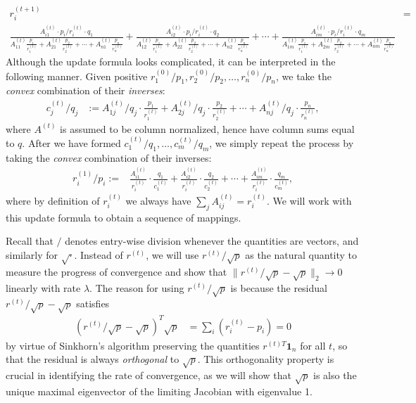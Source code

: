 \begin{align*}
r_{i}^{(t+1)} & =\\
\frac{A_{i1}^{(t)}\cdot p_{i}/r_{i}^{(t)}\cdot q_{1}}{A_{11}^{(t)}\frac{p_{1}}{r_{1}^{(t)}}+A_{21}^{(t)}\frac{p_{2}}{r_{2}^{(t)}}+\cdots+A_{n1}^{(t)}\frac{p_{n}}{r_{n}^{(t)}}}+\frac{A_{i2}^{(t)}\cdot p_{i}/r_{i}^{(t)}\cdot q_{2}}{A_{12}^{(t)}\frac{p_{1}}{r_{1}^{(t)}}+A_{22}^{(t)}\frac{p_{2}}{r_{2}^{(t)}}+\cdots+A_{n2}^{(t)}\frac{p_{n}}{r_{n}^{(t)}}}+\cdots+\frac{A_{im}^{(t)}\cdot p_{i}/r_{i}^{(t)}\cdot q_{m}}{A_{1m}^{(t)}\frac{p_{1}}{r_{1}^{(t)}}+A_{2m}^{(t)}\frac{p_{2}}{r_{2}^{(t)}}+\cdots+A_{nm}^{(t)}\frac{p_{n}}{r_{n}^{(t)}}}
\end{align*}
Although the update formula looks complicated, it can be interpreted
in the following manner. Given positive $r_{1}^{(0)}/p_{1},r_{2}^{(0)}/p_{2},\dots,r_{n}^{(0)}/p_{n}$,
we take the\emph{ convex} combination of their \emph{inverses}:
\begin{align*}
c_{j}^{(t)}/q_{j} & :=A_{1j}^{(t)}/q_{j}\cdot\frac{p_{1}}{r_{1}^{(t)}}+A_{2j}^{(t)}/q_{j}\cdot\frac{p_{2}}{r_{2}^{(t)}}+\cdots+A_{nj}^{(t)}/q_{j}\cdot\frac{p_{n}}{r_{n}^{(t)}},
\end{align*}
 where $A^{(t)}$ is assumed to be column normalized, hence have column
sums equal to $q$. After we have formed $c_{1}^{(t)}/q_{1},\dots,c_{m}^{(t)}/q_{m}$,
we simply repeat the process by taking the \emph{convex} combination
of their inverses: 
\begin{align*}
r_{i}^{(1)}/p_{i}:= & \frac{A_{i1}^{(t)}}{r_{i}^{(t)}}\cdot\frac{q_{1}}{c_{1}^{(t)}}+\frac{A_{i2}^{(t)}}{r_{i}^{(t)}}\cdot\frac{q_{2}}{c_{2}^{(t)}}+\cdots+\frac{A_{im}^{(t)}}{r_{i}^{(t)}}\cdot\frac{q_{m}}{c_{m}^{(t)}},
\end{align*}
 where by definition of $r_{i}^{(t)}$ we always have $\sum_{j}A_{ij}^{(t)}=r_{i}^{(t)}$.
We will work with this update formula to obtain a sequence of mappings. 

Recall that $/$ denotes entry-wise division whenever the quantities
are vectors, and similarly for $\sqrt{\cdot}$. Instead of $r^{(t)}$,
we will use $r^{(t)}/\sqrt{p}$ as the natural quantity to measure
the progress of convergence and show that $\|r^{(t)}/\sqrt{p}-\sqrt{p}\|_{2}\rightarrow0$
linearly with rate $\lambda$. The reason for using $r^{(t)}/\sqrt{p}$
is because the residual $r^{(t)}/\sqrt{p}-\sqrt{p}$ satisfies 
\begin{align*}
(r^{(t)}/\sqrt{p}-\sqrt{p})^{T}\sqrt{p} & =\sum_{i}(r_{i}^{(t)}-p_{i})=0
\end{align*}
by virtue of Sinkhorn's algorithm preserving the quantities $r^{(t)T}\mathbf{1}_{n}$
for all $t$, so that the residual is always \emph{orthogonal} to
$\sqrt{p}$. This orthogonality property is crucial in identifying the rate of convergence,
as we will show that $\sqrt{p}$ is also the unique maximal eigenvector
of the limiting Jacobian with eigenvalue 1. 

